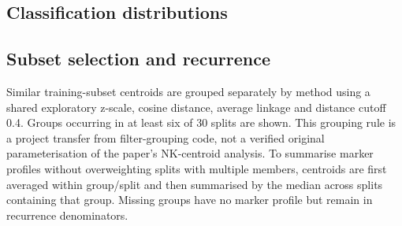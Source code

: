 \documentclass[11pt,a4paper]{article}
\begin{document}
\subsection{Classification distributions}
\begin{table}[htb]\centering\small

\caption{Three-method benchmark on the 30 common splits: median [Q1, Q3]. AUC and AP are score-based, while BA uses the method's declared decision threshold.}
\end{table}
\begin{table}[htb]\centering\small

\caption{Means over the same 30 splits. Means and medians are deliberately reported separately.}
\end{table}
\begin{table}[htb]\centering\small

\caption{Additional CellCNN/SVM comparison over all 100 stored splits: median [Q1, Q3]. This is a separate comparison, not an extension of Citrus to 100 splits.}
\end{table}
\begin{table}[htb]\centering\footnotesize

\caption{Paired AUC differences on identical donor splits. Better/equal/worse counts describe the first method relative to the second. No independence-based significance test is inferred from these overlapping repeats.}
\end{table}

\subsection{Subset selection and recurrence}
\begin{table}[htb]\centering\small

\caption{Selection on the fixed 10,000-cell map and profile availability over 180 full-test-donor visits per method. The denominator for a cell is all test visits of its own donor, not 30.}
\end{table}
\begin{table}[htb]\centering\small

\caption{Recurring training-subset groups from the original centroid analysis. Splits count unique occurrences. Positive and negative counts may overlap within a group.}
\end{table}

Similar training-subset centroids are grouped separately by method using a shared exploratory z-scale, cosine distance, average linkage and distance cutoff 0.4. Groups occurring in at least six of 30 splits are shown. This grouping rule is a project transfer from filter-grouping code, not a verified original parameterisation of the paper's NK-centroid analysis. To summarise marker profiles without overweighting splits with multiple members, centroids are first averaged within group/split and then summarised by the median across splits containing that group. Missing groups have no marker profile but remain in recurrence denominators.
\end{document}
